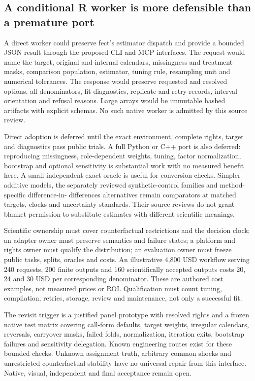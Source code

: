 \subsection{A conditional R worker is more defensible than a premature port}
A direct worker could preserve fect's estimator dispatch and provide a
bounded JSON result through the proposed CLI and MCP interfaces. The
request would name the target, original and internal calendars, missingness
and treatment masks, comparison population, estimator, tuning rule,
resampling unit and numerical tolerances. The response would preserve
requested and resolved options, all denominators, fit diagnostics,
replicate and retry records, interval orientation and refusal reasons.
Large arrays would be immutable hashed artifacts with explicit schemas.
No such native worker is admitted by this source review.
\citep{exec24_fect_choice}

Direct adoption is deferred until the exact environment, complete rights,
target and diagnostics pass public trials. A full Python or C++ port is
also deferred: reproducing missingness, role-dependent weights, tuning,
factor normalization, bootstrap and optional sensitivity is substantial
work with no measured benefit here. A small independent exact oracle is
useful for conversion checks. Simpler additive models, the separately
reviewed synthetic-control families and method-specific difference-in-
differences alternatives remain comparators at matched targets, clocks
and uncertainty standards. Their source reviews do not grant blanket
permission to substitute estimates with different scientific meanings.
\citep{exec24_fect_choice}

Scientific ownership must cover counterfactual restrictions and the
decision clock; an adapter owner must preserve semantics and failure
states; a platform and rights owner must qualify the distribution; an
evaluation owner must freeze public tasks, splits, oracles and costs.
An illustrative 4,800 USD workflow serving 240 requests, 200 finite
outputs and 160 scientifically accepted outputs costs 20, 24 and 30 USD
per corresponding denominator. These are authored cost examples, not
measured prices or ROI. Qualification must count tuning, compilation,
retries, storage, review and maintenance, not only a successful fit.
\citep{exec24_fect_choice}

The revisit trigger is a justified panel prototype with resolved rights
and a frozen native test matrix covering call-form defaults, target
weights, irregular calendars, reversals, carryover masks, failed folds,
normalization, iteration exits, bootstrap failures and sensitivity
delegation. Known engineering routes exist for these bounded checks.
Unknown assignment truth, arbitrary common shocks and unrestricted
counterfactual stability have no universal repair from this interface.
Native, visual, independent and final acceptance remain open.
\citep{exec24_fect_choice}
